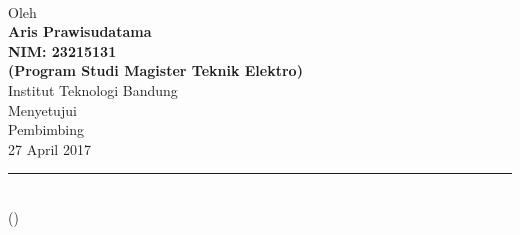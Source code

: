 %
%
%

\singlespacing
\begin{center}
	{\large \textbf{\Judul}} \\
	\vspace*{5\baselineskip}
	Oleh \\
	{\large \textbf{Aris Prawisudatama}} \\
	{\large \textbf{NIM: 23215131}} \\
	{\large \textbf{(Program Studi Magister Teknik Elektro)}}\\
	\vspace*{\baselineskip}
	Institut Teknologi Bandung\\
	\vspace*{5\baselineskip}
	Menyetujui\\
	Pembimbing\\
	\vspace*{\baselineskip}
	27 April 2017\\
	\vspace*{7\baselineskip}
	\rule[0.5ex]{8.2cm}{1pt}\\
	(\pembimbing)
\end{center}


